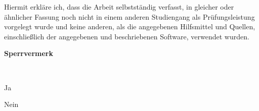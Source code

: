 

\color{black}
\vspace{10mm}

Hiermit erkläre ich, dass die Arbeit selbstständig verfasst, in gleicher oder ähnlicher Fassung noch nicht in einem anderen Studiengang als Prüfungsleistung vorgelegt wurde und keine anderen, als die angegebenen Hilfsmittel und Quellen, einschließlich der angegebenen und beschriebenen Software, verwendet wurden.
%
\vspace{20mm}

\begin{minipage}{\linewidth}
	\begin{minipage}{.30\linewidth}
		\underline{
		}
	\end{minipage}
	\hfill
	\begin{minipage}{.65\linewidth}
		\underline{
			\makebox[.9\linewidth]{
				\phantom{Leipzig, \thesisDate}\hfill
			}
		}
	\end{minipage}	
\end{minipage}

\vspace{20mm}

\ifShowSperrvermerk
{%
	\bfseries\LARGE{}Sperrvermerk
}

\color{black}
\vspace{10mm}

\begin{minipage}{\linewidth}
	\begin{minipage}{.35\linewidth}
        \ 
	\end{minipage}
	\begin{minipage}{.3\linewidth}
		Ja
	\end{minipage}
	\begin{minipage}{.3\linewidth}
		Nein
	\end{minipage}
\end{minipage}

